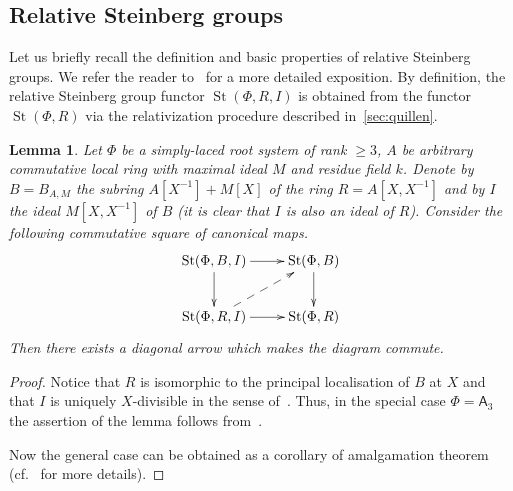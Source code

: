 \documentclass[oneside, 8pt]{amsart}
\newtheorem{lemma}{Lemma}
\theoremstyle{remark}
\theoremstyle{definition}
\DeclareMathOperator{\St}{St}
\newcommand{\rA}{\mathsf{A}}
\numberwithin{equation}{section}
\begin{document}
\subsection{Relative Steinberg groups}
Let us briefly recall the definition and basic properties of relative Steinberg groups.
We refer the reader to~\cite[Section~3]{S15} for a more detailed exposition.
By definition, the relative Steinberg group functor $\St(\Phi, R, I)$ is obtained from the functor $\St(\Phi, R)$
 via the relativization procedure described in~\cref{sec:quillen}.

\begin{lemma}\label{lem:lemma32} Let $\Phi$ be a simply-laced root system of rank $\geq 3$,
$A$ be arbitrary commutative local ring with maximal ideal $M$ and residue field $k$.
Denote by $B = B_{A, M}$ the subring $A[X^{-1}] + M[X]$ of the ring $R = A[X, X^{-1}]$ and
by $I$ the ideal $M[X, X^{-1}]$ of $B$ (it is clear that $I$ is also an ideal of $R$).
Consider the following commutative square of canonical maps.
\[ \xymatrix{
    \St(\Phi, B, I) \ar[r] \ar[d] & \St(\Phi, B) \ar[d] \\
    \St(\Phi, R, I) \ar[r] \ar@{-->}[ur] & \St(\Phi, R) } \]
Then there exists a diagonal arrow which makes the diagram commute.   
\end{lemma} 
\begin{proof}
 Notice that $R$ is isomorphic to the principal localisation of $B$ at $X$
  and that $I$ is uniquely $X$-divisible in the sense of~\cite[\S~4]{LS17}.
 Thus, in the special case $\Phi = \rA_3$ the assertion of the lemma follows from~\cite[Theorem~3]{LS17}.
 
 Now the general case can be obtained as a corollary of amalgamation theorem~\cite[Theorem~9]{S15}
  (cf.~\cite[\S~4]{LS17} for more details).
\end{proof}
\end{document}
